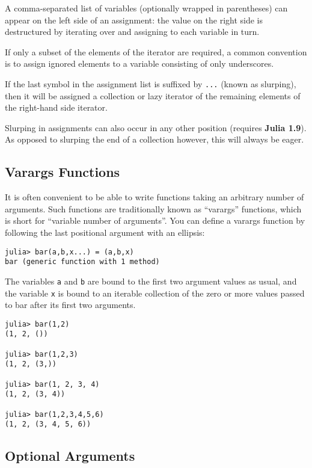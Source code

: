 \documentclass[
]{article}
\begin{document}
A comma-separated list of variables (optionally wrapped in parentheses)
can appear on the left side of an assignment: the value on the right
side is destructured by iterating over and assigning to each variable in
turn.

If only a subset of the elements of the iterator are required, a common
convention is to assign ignored elements to a variable consisting of
only underscores.

If the last symbol in the assignment list is suffixed by \texttt{...}
(known as slurping), then it will be assigned a collection or lazy
iterator of the remaining elements of the right-hand side iterator.

Slurping in assignments can also occur in any other position (requires
\textbf{Julia 1.9}). As opposed to slurping the end of a collection
however, this will always be eager.

\hypertarget{varargs-functions}{%
\subsection{Varargs Functions}\label{varargs-functions}}

It is often convenient to be able to write functions taking an arbitrary
number of arguments. Such functions are traditionally known as
``varargs'' functions, which is short for ``variable number of
arguments''. You can define a varargs function by following the last
positional argument with an ellipsis:

\begin{verbatim}
julia> bar(a,b,x...) = (a,b,x)
bar (generic function with 1 method)
\end{verbatim}

The variables \texttt{a} and \texttt{b} are bound to the first two
argument values as usual, and the variable \texttt{x} is bound to an
iterable collection of the zero or more values passed to bar after its
first two arguments.

\begin{verbatim}
julia> bar(1,2)
(1, 2, ())

julia> bar(1,2,3)
(1, 2, (3,))

julia> bar(1, 2, 3, 4)
(1, 2, (3, 4))

julia> bar(1,2,3,4,5,6)
(1, 2, (3, 4, 5, 6))
\end{verbatim}

\hypertarget{optional-arguments}{%
\subsection{Optional Arguments}\label{optional-arguments}}
\end{document}
